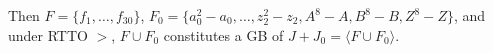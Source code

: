 \begin{Example}
Then $F = \{f_1,\dots,f_{30}\}$, $F_0 =
\{a_0^2-a_0,\dots,z_2^2-z_2,A^8-A,B^8-B,Z^8-Z\}$, and under RTTO $>$, $F\cup
F_{0}$ constitutes a GB of $J+J_0=\langle F\cup F_0\rangle$.
\end{Example}

